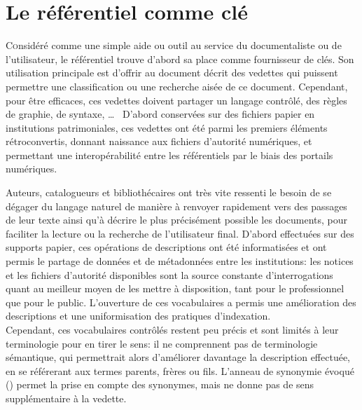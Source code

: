 \chapter{\label{I-A}Le référentiel comme clé}

\lettrine{C}onsidéré comme une simple aide ou outil au service du documentaliste ou de l'utilisateur, le référentiel trouve d'abord sa place comme fournisseur de clés. Son utilisation principale est d'offrir au document décrit des vedettes qui puissent permettre une classification ou une recherche aisée de ce document. Cependant, pour être efficaces, ces vedettes doivent partager un langage contrôlé, des règles de graphie, de syntaxe, \dots~ D'abord conservées sur des fichiers papier en institutions patrimoniales, ces vedettes ont été parmi les premiers éléments rétroconvertis, donnant naissance aux fichiers d'autorité numériques, et permettant une interopérabilité entre les référentiels par le biais des portails numériques.







\bigskip
\bigskip
\bigskip
Auteurs, catalogueurs et bibliothécaires ont très vite ressenti le besoin de se dégager du langage naturel de manière à renvoyer rapidement vers des passages de leur texte ainsi qu'à décrire le plus précisément possible les documents, pour faciliter la lecture ou la recherche de l'utilisateur final. D'abord effectuées sur des supports papier, ces opérations de descriptions ont été informatisées et ont permis le partage de données et de métadonnées entre les institutions: les notices et les fichiers d'autorité disponibles sont la source constante d'interrogations quant au meilleur moyen de les mettre à disposition, tant pour le professionnel que pour le public. L'ouverture de ces vocabulaires a permis une amélioration des descriptions et une uniformisation des pratiques d'indexation.\\

Cependant, ces vocabulaires contrôlés restent peu précis et sont limités à leur terminologie pour en tirer le sens: il ne comprennent pas de terminologie sémantique, qui permettrait alors d'améliorer davantage la description effectuée, en se référerant aux termes parents, frères ou fils. L'anneau de synonymie évoqué () permet la prise en compte des synonymes, mais ne donne pas de sens supplémentaire à la vedette.